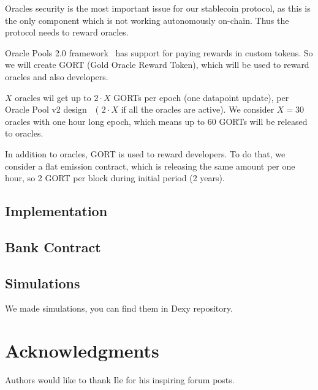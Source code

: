 \documentclass{article}   %
\newcommand{\authnote}[2]{\marginpar{\parbox{\marginparwidth}{\tiny %
  \textsf{#1 {\textcolor{blue}{notes: #2}}}}}%
  \textcolor{blue}{\textbf{\dag}}}
\newcommand{\authnote}[2]{
  \textsf{#1 \textcolor{blue}{: #2}}}
\newcommand{\authnote}[2]{}
\newcommand{\knote}[1]{{\authnote{\textcolor{green}{Alex notes}}{#1}}}
\newcommand{\dx}{Dexy}
\begin{document}
Oracles security is the most important issue for our stablecoin protocol, as this is the only component which is
not working autonomously on-chain. Thus the protocol needs to reward oracles.

Oracle Pools 2.0 framework~\cite{eip23} has support for paying rewards in custom tokens. So we will create GORT (Gold
Oracle Reward Token), which will be used to reward oracles and also developers.

$X$ oracles wil get up to $2 \cdot X$ GORTs per epoch (one datapoint update), per Oracle Pool v2 design~\cite{eip23}~(
$2 \cdot X$ if all the oracles are active). We consider $X = 30$ oracles with one hour long epoch, which means up to $60$
GORTs will be released to oracles.

In addition to oracles, GORT is used to reward developers. To do that, we consider a flat emission contract, which is
releasing the same amount per one hour, so 2 GORT per block during initial period (2 years).

\subsection{Implementation}


\subsection{Bank Contract}
\knote{put contracts here}

\subsection{Simulations}
We made simulations, you can find them in \dx{} repository. \knote{finish}


\section*{Acknowledgments}

Authors would like to thank Ile for his inspiring forum posts.



\end{document}
